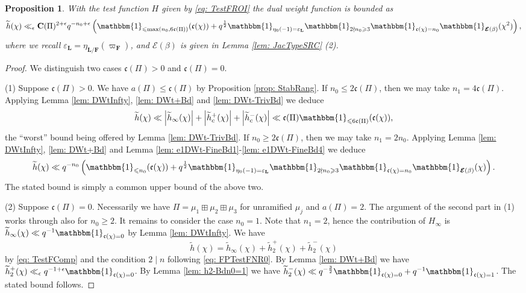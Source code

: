 \documentclass[A4]{amsart}
\def\leq{\leqslant}
\def\geq{\geqslant}
\newtheorem{proposition}[theorem]{Proposition}
\numberwithin{equation}{section} \everymath{\displaystyle}
\newcommand{\id}{\mathbbm{1}}
\newcommand{\F}{\mathbf{F}}
\newcommand{\bL}{\mathbf{L}}
\newcommand{\extnorm}[1]{\left\lvert #1 \right\rvert}
\newcommand{\Cond}{\mathbf{C}}
\newcommand{\cond}{\mathfrak{c}}
\newcommand{\Ecp}{\boldsymbol{\mathcal{E}}}
\begin{document}
\begin{proposition} \label{prop: DWtBde=1}
	With the test function $H$ given by \eqref{eq: TestFROI} the dual weight function is bounded as
	$$ \widetilde{h}(\chi) \ll_{\epsilon} \Cond(\Pi)^{2+\epsilon} q^{-n_0+\epsilon} \left( \id_{\leq \max(n_0,6\cond(\Pi))}(\cond(\chi)) + q^{\frac{1}{2}} \id_{\eta_0(-1) = \varepsilon_{\bL}} \id_{2 \nmid n_0 \geq 3} \id_{\cond(\chi) = n_0} \id_{\Ecp(\beta)}(\chi^2) \right), $$
	where we recall $\varepsilon_{\bL} = \eta_{\bL/\F}(\varpi_{\F})$, and $\Ecp(\beta)$ is given in Lemma \ref{lem: JacTypeSRC} (2).
\end{proposition}
\begin{proof}
	We distinguish two cases $\cond(\Pi) > 0$ and $\cond(\Pi) = 0$.
	
\noindent (1) Suppose $\cond(\Pi) > 0$. We have $a(\Pi) \leq \cond(\Pi)$ by Proposition \ref{prop: StabRang}. If $n_0 \leq 2\cond(\Pi)$, then we may take $n_1=4\cond(\Pi)$. Applying Lemma \ref{lem: DWtInfty}, \ref{lem: DWt+Bd} and \ref{lem: DWt-TrivBd} we deduce
	$$ \widetilde{h}(\chi) \ll \extnorm{\widetilde{h}_{\infty}(\chi)} + \extnorm{\widetilde{h}_c^+(\chi)} + \extnorm{\widetilde{h}_c^-(\chi)} \ll \cond(\Pi) \id_{\leq 6\cond(\Pi)}(\cond(\chi)), $$
	the ``worst'' bound being offered by Lemma \ref{lem: DWt-TrivBd}. If $n_0 \geq 2 \cond(\Pi)$, then we may take $n_1=2n_0$. Applying Lemma \ref{lem: DWtInfty}, \ref{lem: DWt+Bd} and Lemma \ref{lem: e1DWt-FineBd1}-\ref{lem: e1DWt-FineBd4} we deduce
	$$ \widetilde{h}(\chi) \ll q^{-n_0} \left( \id_{\leq n_0}(\cond(\chi)) + q^{\frac{1}{2}} \id_{\eta_0(-1) = \varepsilon_{\bL}} \id_{2 \nmid n_0 \geq 3} \id_{\cond(\chi) = n_0} \id_{\Ecp(\beta)}(\chi) \right). $$
	The stated bound is simply a common upper bound of the above two.
	
\noindent (2) Suppose $\cond(\Pi)=0$. Necessarily we have $\Pi = \mu_1 \boxplus \mu_2 \boxplus \mu_3$ for unramified $\mu_j$ and $a(\Pi)=2$. The argument of the second part in (1) works through also for $n_0 \geq 2$. It remains to consider the case $n_0=1$. Note that $n_1 = 2$, hence the contribution of $H_{\infty}$ is $\widetilde{h}_{\infty}(\chi) \ll q^{-1} \id_{\cond(\chi)=0}$ by Lemma \ref{lem: DWtInfty}. We have
	$$ \widetilde{h}(\chi) = \widetilde{h}_{\infty}(\chi) + \widetilde{h}_2^+(\chi) + \widetilde{h}_2^-(\chi) $$
by \eqref{eq: TestFComp} and the condition $2 \mid n$ following \eqref{eq: FPTestFNR0}. By Lemma \ref{lem: DWt+Bd} we have $\widetilde{h}_2^+(\chi) \ll_{\epsilon} q^{-1+\epsilon} \id_{\cond(\chi)=0}$. By Lemma \ref{lem: h2-Bdn0=1} we have $\widetilde{h}_2^-(\chi) \ll q^{-\frac{3}{2}} \id_{\cond(\chi)=0} + q^{-1} \id_{\cond(\chi)=1}$. The stated bound follows.
\end{proof}	
\end{document}
